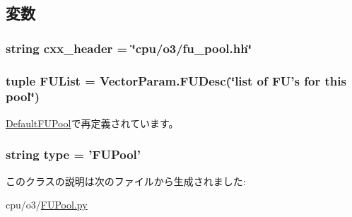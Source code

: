 \subsection{変数}
\hypertarget{classFUPool_1_1FUPool_a17da7064bc5c518791f0c891eff05fda}{
\subsubsection[{cxx\_\-header}]{\setlength{\rightskip}{0pt plus 5cm}string {\bf cxx\_\-header} = \char`\"{}cpu/o3/fu\_\-pool.hh\char`\"{}}}
\label{classFUPool_1_1FUPool_a17da7064bc5c518791f0c891eff05fda}
\hypertarget{classFUPool_1_1FUPool_a82873a213d944933f9899d3ad30cb8cd}{
\subsubsection[{FUList}]{\setlength{\rightskip}{0pt plus 5cm}tuple {\bf FUList} = VectorParam.FUDesc(\char`\"{}list of FU's for this pool\char`\"{})}}
\label{classFUPool_1_1FUPool_a82873a213d944933f9899d3ad30cb8cd}


\hyperlink{classFUPool_1_1DefaultFUPool_a6187893abba0317192a9d839f42ab478}{DefaultFUPool}で再定義されています。\hypertarget{classFUPool_1_1FUPool_acce15679d830831b0bbe8ebc2a60b2ca}{
\subsubsection[{type}]{\setlength{\rightskip}{0pt plus 5cm}string {\bf type} = '{\bf FUPool}'}}
\label{classFUPool_1_1FUPool_acce15679d830831b0bbe8ebc2a60b2ca}


このクラスの説明は次のファイルから生成されました:\begin{DoxyCompactItemize}
\item 
cpu/o3/\hyperlink{FUPool_8py}{FUPool.py}\end{DoxyCompactItemize}
